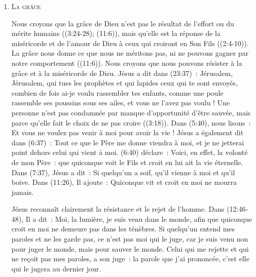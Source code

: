 \begin{enumerate}
  \item  \textsc{La grâce}

\nobreak
\begin{pocketpar}{}
Nous croyons que la grâce de Dieu n'est pas le résultat de l'effort
 ou du mérite humains
 ((3:24-28); (11:6)),
 mais qu'elle est la réponse
 de la miséricorde et de l'amour de Dieu à ceux qui croiront en Son Fils
 ((2:4-10)).
 La grâce nous donne 
 ce que nous ne méritons pas, ni ne pouvons gagner par notre comportement
 ((11:6)).
 Nous croyons que nous pouvons résister à la grâce et à la miséricorde de Dieu.
 Jésus a dit dans (23:37)~:
 \og Jérusalem, Jérusalem, qui tues les prophètes et qui lapides ceux
 qui te sont envoyés, combien de fois ai-je voulu rassembler tes enfants,
 comme une poule rassemble ses poussins sous ses ailes, et vous ne l'avez pas voulu ! \fg{}
 Une personne n'est pas condamnée par manque d'opportunité d'être sauvée, 
 mais parce qu'elle fait le choix de ne pas croire
 ((3:18)).
 Dans (5:40), nous lisons~:
 \og Et vous ne voulez pas venir à moi pour avoir la vie ! \fg{}
 Jésus a également dit dans (6:37)~:
 \og Tout ce que le Père me donne viendra à moi,
 et je ne jetterai point dehors celui qui vient à moi. \fg{}
 (6:40) déclare~:
 \og Voici, en effet, la volonté de mon Père~: que quiconque voit le Fils
 et croit en lui ait la vie éternelle. \fg{}
 Dans (7:37), Jésus a dit~:
 \og Si quelqu'un a soif, qu'il vienne à moi et qu'il boive. \fg{}
 Dans (11:26), Il ajoute~:
 \og Quiconque vit et croit en moi ne mourra jamais. \fg{}
\end{pocketpar}

Jésus reconnaît clairement la résistance et le rejet de l'hom\-me.
 Dans (12:46-48), Il a dit~:
 \og Moi, la lumière, je suis venu dans le monde, afin que quiconque croit
 en moi ne demeure pas dans les ténèbres. Si quelqu'un entend mes paroles
 et ne les garde pas, ce n'est pas moi qui le juge, car je suis venu non
 pour juger le monde, mais pour sauver le monde. Celui qui me rejette et qui
 ne reçoit pas mes paroles, a son juge~: la parole que j'ai prononcée,
 c'est elle qui le jugera au dernier jour. \fg{}


\end{enumerate}
